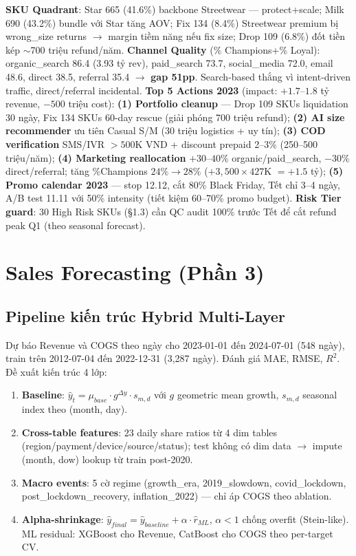\documentclass{article}
\begin{document}
\textbf{SKU Quadrant}: Star 665 (41.6\%) backbone Streetwear --- protect+scale; Milk 690 (43.2\%) bundle với Star tăng AOV; Fix 134 (8.4\%) Streetwear premium bị wrong\_size returns $\to$ margin tiềm năng nếu fix size; Drop 109 (6.8\%) đốt tiền kép $\sim$700 triệu refund/năm. \textbf{Channel Quality} (\% Champions+\% Loyal): organic\_search 86.4 (3.93 tỷ rev), paid\_search 73.7, social\_media 72.0, email 48.6, direct 38.5, referral 35.4 $\to$ \textbf{gap 51pp}. Search-based thắng vì intent-driven traffic, direct/referral incidental.
\textbf{Top 5 Actions 2023} (impact: $+1.7$--$1.8$ tỷ revenue, $-500$ triệu cost): \textbf{(1) Portfolio cleanup} --- Drop 109 SKUs liquidation 30 ngày, Fix 134 SKUs 60-day rescue (giải phóng 700 triệu refund); \textbf{(2) AI size recommender} ưu tiên Casual S/M (30 triệu logistics + uy tín); \textbf{(3) COD verification} SMS/IVR $>500$K VND + discount prepaid 2--3\% (250--500 triệu/năm); \textbf{(4) Marketing reallocation} $+30$--$40\%$ organic/paid\_search, $-30\%$ direct/referral; tăng \%Champions $24\%\to28\%$ ($+3,500 \times 427$K $= +1.5$ tỷ); \textbf{(5) Promo calendar 2023} --- stop 12.12, cắt 80\% Black Friday, Tết chỉ 3--4 ngày, A/B test 11.11 với 50\% intensity (tiết kiệm 60--70\% promo budget). \textbf{Risk Tier guard}: 30 High Risk SKUs (§1.3) cần QC audit 100\% trước Tết để cắt refund peak Q1 (theo seasonal forecast).


\section{Sales Forecasting (Phần 3)}

\subsection{Pipeline kiến trúc Hybrid Multi-Layer}

Dự báo Revenue và COGS theo ngày cho 2023-01-01 đến 2024-07-01 (548 ngày), train trên 2012-07-04 đến 2022-12-31 (3,287 ngày). Đánh giá MAE, RMSE, $R^2$. Đề xuất kiến trúc 4 lớp:

\begin{enumerate}[leftmargin=*,itemsep=1pt,topsep=2pt]
    \item \textbf{Baseline}: $\hat{y}_t = \mu_{base} \cdot g^{\Delta y} \cdot s_{m,d}$ với $g$ geometric mean growth, $s_{m,d}$ seasonal index theo (month, day).
    \item \textbf{Cross-table features}: 23 daily share ratios từ 4 dim tables (region/payment/device/source/status); test không có dim data $\to$ impute (month, dow) lookup từ train post-2020.
    \item \textbf{Macro events}: 5 cờ regime (growth\_era, 2019\_slowdown, covid\_lockdown, post\_lockdown\_recovery, inflation\_2022) --- chỉ áp COGS theo ablation.
    \item \textbf{Alpha-shrinkage}: $\hat{y}_{final} = \hat{y}_{baseline} + \alpha \cdot \hat{r}_{ML}$, $\alpha < 1$ chống overfit (Stein-like). ML residual: XGBoost cho Revenue, CatBoost cho COGS theo per-target CV.
\end{enumerate}
\end{document}
